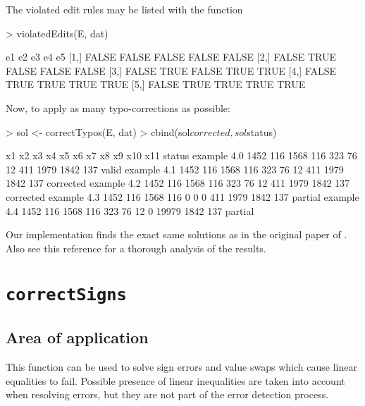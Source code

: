 \documentclass[11pt, fleqn, a4paper]{article}
\begin{document}
The violated edit rules may be listed with the function
\begin{Schunk}
\begin{Sinput}
> violatedEdits(E, dat)
\end{Sinput}
\begin{Soutput}
        e1    e2    e3    e4    e5
[1,] FALSE FALSE FALSE FALSE FALSE
[2,] FALSE  TRUE FALSE FALSE FALSE
[3,] FALSE  TRUE FALSE  TRUE  TRUE
[4,] FALSE  TRUE  TRUE  TRUE  TRUE
[5,] FALSE  TRUE  TRUE  TRUE  TRUE
\end{Soutput}
\end{Schunk}
Now, to apply as many typo-corrections as possible:
\begin{Schunk}
\begin{Sinput}
> sol <- correctTypos(E, dat)
> cbind(sol$corrected, sol$status)
\end{Sinput}
\begin{Soutput}
              x1  x2   x3  x4  x5 x6 x7  x8    x9  x10 x11    status
example 4.0 1452 116 1568 116 323 76 12 411  1979 1842 137     valid
example 4.1 1452 116 1568 116 323 76 12 411  1979 1842 137 corrected
example 4.2 1452 116 1568 116 323 76 12 411  1979 1842 137 corrected
example 4.3 1452 116 1568 116   0  0  0 411  1979 1842 137   partial
example 4.4 1452 116 1568 116 323 76 12   0 19979 1842 137   partial
\end{Soutput}
\end{Schunk}
Our implementation finds the exact same solutions as in the original paper of
\cite{scholtus:2009}.  Also see this reference for a thorough analysis of the
results.

%
%
%
\section{\tt correctSigns}
\label{signErrors}
\subsection{Area of application}
This function can be used to solve sign errors and value swaps which cause
linear equalities to fail. Possible presence of linear inequalities are taken
into account when resolving errors, but they are not part of the error
detection process.
\end{document}
